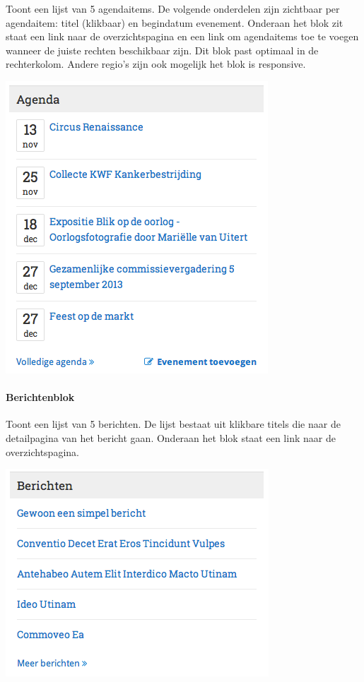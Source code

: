 Toont een lijst van 5 agendaitems. De volgende onderdelen zijn zichtbaar per agendaitem: titel (klikbaar) en begindatum evenement. Onderaan het blok zit staat een link naar de overzichtspagina en een link om agendaitems toe te voegen wanneer de juiste rechten beschikbaar zijn. Dit blok past optimaal in de rechterkolom. Andere regio's zijn ook mogelijk het blok is responsive.

\begin{center}
	\includegraphics[scale=0.5]{img/blokken/agendalist.png}
\end{center}

\paragraph{Berichtenblok}

Toont een lijst van 5 berichten. De lijst bestaat uit klikbare titels die naar de detailpagina van het bericht gaan. Onderaan het blok staat een link naar de overzichtspagina.

\begin{center}
	\includegraphics[scale=0.5]{img/blokken/berichten.png}
\end{center}

